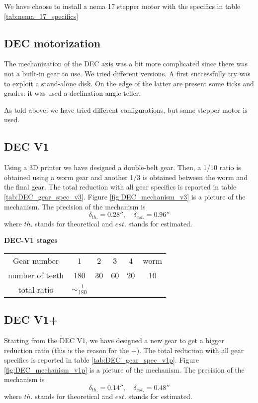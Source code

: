 We have choose to install a nema 17 stepper motor with the specifics in table \ref{tab:nema_17_specifics}

\subsection{DEC motorization}
The mechanization of the DEC axis was a bit more complicated since there was not a built-in gear to use.
We tried different versions.
A first successfully try was to exploit a stand-alone disk.
On the edge of the latter are present some ticks and grades: it was used a declination angle teller.

As told above, we have tried different configurations, but same stepper motor is used.

\subsection{DEC V1}
Using a 3D printer we have designed a double-belt gear.
Then, a 1/10 ratio is obtained using a worm gear and another 1/3 is obtained between the worm and the final gear.
The total reduction with all gear specifics is reported in table \ref{tab:DEC_gear_spec_v3}.
Figure \ref{fig:DEC_mechanism_v3} is a picture of the mechanism.
The precision of the mechanism is 
\[\delta_{th.}=0.28'',\quad \delta_{est.}=0.96''\]
where \(th.\) stands for theoretical and \(est.\) stands for estimated.

\begin{minipage}
    {0.5\textwidth}
    \textbf{DEC-V1 stages}\\
    \centering
    \begin{tabular}{cccccc}
        \hline
        Gear number & 1 & 2 & 3 & 4 & worm\\
        number of teeth & 180 & 30 & 60 & 20 & 10\\
        \hline
        total ratio & \(\sim \frac{1}{180}\) &&&
    \end{tabular}
    \label{tab:DEC_gear_spec_v3}
\end{minipage}

\subsection{DEC V1+}
Starting from the DEC V1, we have designed a new gear to get a bigger reduction ratio (this is the reason for the +).
The total reduction with all gear specifics is reported in table \ref{tab:DEC_gear_spec_v1p}.
Figure \ref{fig:DEC_mechanism_v1p} is a picture of the mechanism.
The precision of the mechanism is 
\[\delta_{th.}=0.14'',\quad \delta_{est.}=0.48''\]
where \(th.\) stands for theoretical and \(est.\) stands for estimated.

